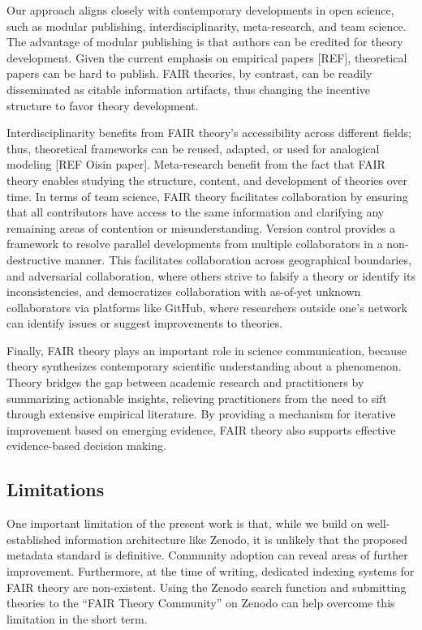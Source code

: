 \documentclass[
  man,floatsintext]{apa6}
\begin{document}
Our approach aligns closely with contemporary developments in open science,
such as modular publishing, interdisciplinarity, meta-research, and team science.
The advantage of modular publishing is that authors can be credited for theory development.
Given the current emphasis on empirical papers {[}REF{]}, theoretical papers can be hard to publish.
FAIR theories, by contrast, can be readily disseminated as citable information artifacts, thus changing the incentive structure to favor theory development.

Interdisciplinarity benefits from FAIR theory's accessibility across different fields; thus, theoretical frameworks can be reused, adapted, or used for analogical modeling {[}REF Oisin paper{]}.
Meta-research benefit from the fact that FAIR theory enables studying the structure, content, and development of theories over time.
In terms of team science, FAIR theory facilitates collaboration by ensuring that all contributors have access to the same information and
clarifying any remaining areas of contention or misunderstanding.
Version control provides a framework to resolve parallel developments from multiple collaborators in a non-destructive manner.
This facilitates collaboration across geographical boundaries,
and adversarial collaboration, where others strive to falsify a theory or identify its inconsistencies, and democratizes collaboration with as-of-yet unknown collaborators via platforms like GitHub, where researchers outside one's network can identify issues or suggest improvements to theories.

Finally, FAIR theory plays an important role in science communication, because theory synthesizes contemporary scientific understanding about a phenomenon.
Theory bridges the gap between academic research and practitioners by summarizing actionable insights, relieving practitioners from the need to sift through extensive empirical literature.
By providing a mechanism for iterative improvement based on emerging evidence, FAIR theory also supports effective evidence-based decision making.

\subsection{Limitations}\label{limitations}

One important limitation of the present work is that,
while we build on well-established information architecture like Zenodo,
it is unlikely that the proposed metadata standard is definitive.
Community adoption can reveal areas of further improvement.
Furthermore, at the time of writing, dedicated indexing systems for FAIR theory are non-existent.
Using the Zenodo search function and submitting theories to the ``FAIR Theory Community'' on Zenodo can help overcome this limitation in the short term.
\end{document}
